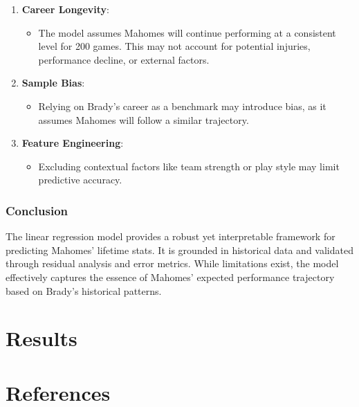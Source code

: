 \documentclass[
  letterpaper,
  DIV=11,
  numbers=noendperiod]{scrartcl}
\providecommand{\tightlist}{%
  \setlength{\itemsep}{0pt}\setlength{\parskip}{0pt}}\usepackage{longtable,booktabs,array}
\begin{document}
\begin{enumerate}
\def\labelenumi{\arabic{enumi}.}
\tightlist
\item
  \textbf{Career Longevity}:

  \begin{itemize}
  \tightlist
  \item
    The model assumes Mahomes will continue performing at a consistent
    level for 200 games. This may not account for potential injuries,
    performance decline, or external factors.\\
  \end{itemize}
\item
  \textbf{Sample Bias}:

  \begin{itemize}
  \tightlist
  \item
    Relying on Brady's career as a benchmark may introduce bias, as it
    assumes Mahomes will follow a similar trajectory.\\
  \end{itemize}
\item
  \textbf{Feature Engineering}:

  \begin{itemize}
  \tightlist
  \item
    Excluding contextual factors like team strength or play style may
    limit predictive accuracy.
  \end{itemize}
\end{enumerate}

\subsubsection{Conclusion}\label{conclusion}

The linear regression model provides a robust yet interpretable
framework for predicting Mahomes' lifetime stats. It is grounded in
historical data and validated through residual analysis and error
metrics. While limitations exist, the model effectively captures the
essence of Mahomes' expected performance trajectory based on Brady's
historical patterns.

\section{Results}\label{results}

\newpage

\section*{References}\label{references}
\end{document}
